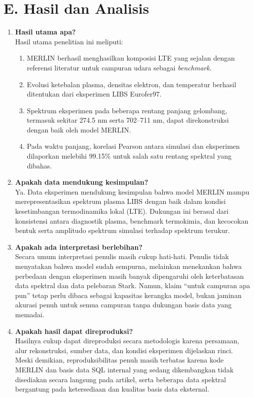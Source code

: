 \documentclass[12pt,a4paper]{article}
\begin{document}
\section*{E. Hasil dan Analisis}
\begin{enumerate}
  \item \textbf{Hasil utama apa?}\\
  Hasil utama penelitian ini meliputi:
  \begin{enumerate}
    \item MERLIN berhasil menghasilkan komposisi LTE yang sejalan dengan referensi literatur untuk campuran udara sebagai \textit{benchmark}.
    \item Evolusi ketebalan plasma, densitas elektron, dan temperatur berhasil ditentukan dari eksperimen LIBS Eurofer97.
    \item Spektrum eksperimen pada beberapa rentang panjang gelombang, termasuk sekitar 274.5 nm serta 702--711 nm, dapat direkonstruksi dengan baik oleh model MERLIN.
    \item Pada waktu panjang, korelasi Pearson antara simulasi dan eksperimen dilaporkan melebihi 99.15\% untuk salah satu rentang spektral yang dibahas.
  \end{enumerate}

  \item \textbf{Apakah data mendukung kesimpulan?}\\
  Ya. Data eksperimen mendukung kesimpulan bahwa model MERLIN mampu merepresentasikan spektrum plasma LIBS dengan baik dalam kondisi kesetimbangan termodinamika lokal (LTE). Dukungan ini berasal dari konsistensi antara diagnostik plasma, benchmark termokimia, dan kecocokan bentuk serta amplitudo spektrum simulasi terhadap spektrum terukur.

  \item \textbf{Apakah ada interpretasi berlebihan?}\\
  Secara umum interpretasi penulis masih cukup hati-hati. Penulis tidak menyatakan bahwa model sudah sempurna, melainkan menekankan bahwa perbedaan dengan eksperimen masih banyak dipengaruhi oleh keterbatasan data spektral dan data pelebaran Stark. Namun, klaim ``untuk campuran apa pun'' tetap perlu dibaca sebagai kapasitas kerangka model, bukan jaminan akurasi penuh untuk semua campuran tanpa dukungan basis data yang memadai.

  \item \textbf{Apakah hasil dapat direproduksi?}\\
  Hasilnya cukup dapat direproduksi secara metodologis karena persamaan, alur rekonstruksi, sumber data, dan kondisi eksperimen dijelaskan rinci. Meski demikian, reproduksibilitas penuh masih terbatas karena kode MERLIN dan basis data SQL internal yang sedang dikembangkan tidak disediakan secara langsung pada artikel, serta beberapa data spektral bergantung pada ketersediaan dan kualitas basis data eksternal.
\end{enumerate}
\end{document}
